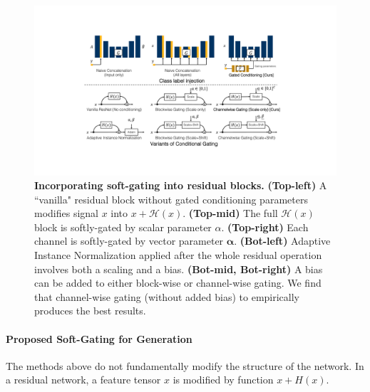 \begin{figure}[t]
    \centering
    \includegraphics[width=\linewidth]{paper_images/arch_gate.pdf}
    \caption{{\bf Incorporating soft-gating into residual blocks.} {\bf (Top-left)} A ``vanilla" residual block without gated conditioning parameters modifies signal $x$ into $x+\mathcal{H}(x)$. {\bf (Top-mid)} The full $\mathcal{H}(x)$ block is softly-gated by scalar parameter $\alpha$. {\bf (Top-right)} Each channel is softly-gated by vector parameter $\mathbf{\alpha}$. {\bf (Bot-left)} Adaptive Instance Normalization applied after the whole residual operation involves both a scaling and a bias. {\bf (Bot-mid, Bot-right)} A bias can be added to either block-wise or channel-wise gating. We find that channel-wise gating (without added bias) to empirically produces the best results.\label{fig:arch-gate} }
\end{figure}

\paragraph{Proposed Soft-Gating for Generation} The methods above do not fundamentally modify the structure of the network. In a residual network, a feature tensor $x$ is modified by function $x+H(x)$.

